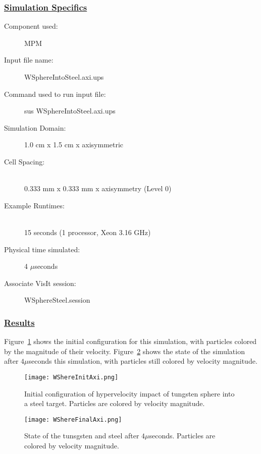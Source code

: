 \subsubsection*{\underline{Simulation Specifics}}
\begin{description}
\item [Component used:] \hfill MPM
\item [Input file name:] \hfill WSphereIntoSteel.axi.ups
\item [Command used to run input file:]\hfill sus WSphereIntoSteel.axi.ups
\item [Simulation Domain:]\hfill 1.0 cm x 1.5 cm x axisymmetric

\item [Cell Spacing:]\hfill \\
  0.333 mm x 0.333 mm x axisymmetry (Level 0)

\item [Example Runtimes:] \hfill \\
 15 seconds  (1 processor, Xeon 3.16 GHz)\\

\item [Physical time simulated:] \hfill 4 $\mu$seconds

\item [Associate VisIt session:] \hfill WSphereSteel.session

\end{description}

\subsubsection*{\underline{Results}}

Figure~\ref{fig:WSphereSteelInit} shows the initial configuration for
this simulation, with particles colored by the magnitude of their velocity.
Figure~\ref{fig:WSphereSteelFinal} shows the state of the simulation after
$4 \mu$seconds this simulation, with particles still colored by velocity
magnitude.

\begin{figure}
  \center
  \texttt{[image: WShereInitAxi.png]}
  \caption{Initial configuration of hypervelocity impact of tungsten sphere
           into a steel target.  Particles are
           colored by velocity magnitude.}
  \label{fig:WSphereSteelInit}
\end{figure}
\newpage
\begin{figure}
  \center
  \texttt{[image: WShereFinalAxi.png]}
  \caption{State of the tunsgsten and steel after $4 \mu$seconds.
           Particles are colored by velocity magnitude.}
  \label{fig:WSphereSteelFinal}
\end{figure}





